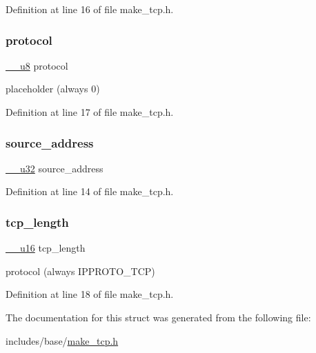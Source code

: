 Definition at line 16 of file make\+\_\+tcp.\+h.

\mbox{\label{structtcp__pseudo__header_a56a37c755bcacb62a730e595c482fd27}} 
\subsubsection{\texorpdfstring{protocol}{protocol}}
{\footnotesize\ttfamily \hyperlink{asm__types_8h_a77f8102529baef48621b98012524115d}{\+\_\+\+\_\+u8} protocol}



placeholder (always 0) 



Definition at line 17 of file make\+\_\+tcp.\+h.

\mbox{\label{structtcp__pseudo__header_ae43692ff239e4d41b3109cead61f2961}} 
\subsubsection{\texorpdfstring{source\+\_\+address}{source\_address}}
{\footnotesize\ttfamily \hyperlink{asm__types_8h_a3acae9310e2c2e411e800a8a369171c6}{\+\_\+\+\_\+u32} source\+\_\+address}



Definition at line 14 of file make\+\_\+tcp.\+h.

\mbox{\label{structtcp__pseudo__header_a21a0a4cdb18a854d72e4d45339e8623e}} 
\subsubsection{\texorpdfstring{tcp\+\_\+length}{tcp\_length}}
{\footnotesize\ttfamily \hyperlink{asm__types_8h_abc70358187152575fd05fbf6d253151f}{\+\_\+\+\_\+u16} tcp\+\_\+length}



protocol (always I\+P\+P\+R\+O\+T\+O\+\_\+\+T\+CP) 



Definition at line 18 of file make\+\_\+tcp.\+h.



The documentation for this struct was generated from the following file\+:\begin{DoxyCompactItemize}
\item 
includes/base/\hyperlink{make__tcp_8h}{make\+\_\+tcp.\+h}\end{DoxyCompactItemize}

